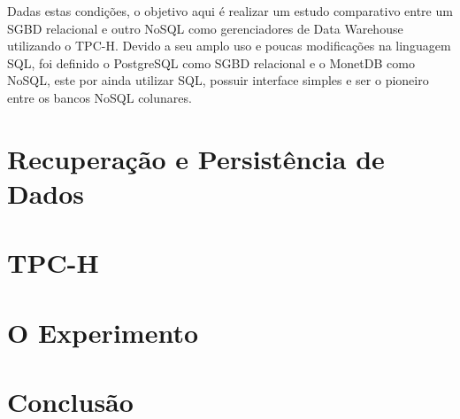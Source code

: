 \documentclass[12pt]{article}
\begin{document}
Dadas estas condições, o objetivo aqui é realizar um estudo comparativo entre um SGBD relacional e outro NoSQL 
como gerenciadores de Data Warehouse utilizando o TPC-H. Devido a seu amplo uso e poucas modificações na linguagem SQL, foi definido o PostgreSQL 
como SGBD relacional e o MonetDB como NoSQL, este por ainda utilizar SQL, possuir interface simples e ser o pioneiro 
entre os bancos NoSQL colunares.

\section{Recuperação e Persistência de Dados}




\section{TPC-H}

\section{O Experimento}

\section{Conclusão}



\end{document}
